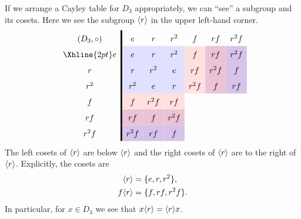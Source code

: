 \documentclass{ximera}
\begin{document}
\begin{example}
  If we arrange a Cayley table for $D_3$ appropriately, we can ``see''
  a subgroup and its cosets. Here we see the subgroup $\langle r\rangle$ in the
  upper left-hand corner.
    \[
    \renewcommand{\arraystretch}{1.6}
    \begin{array}{c!{\vline width 2pt}cccccc}
      (D_3,\circ)& e                              & r                              & r^2                            & f                             & r f                                   & r^2 f  \\  \Xhline{2pt}
      e          & e\cellcolor{blue!12!white}     & r\cellcolor{blue!12!white}    & r^2\cellcolor{blue!12!white}   & f \cellcolor{red!12!white}    & r f \cellcolor{blue!33!red!24!white}   & r^2f \cellcolor{blue!66!red!24!white} \\  
      r                                  & r\cellcolor{blue!12!white}    & r^2\cellcolor{blue!12!white}   & e \cellcolor{blue!12!white}    & rf\cellcolor{red!12!white} & r^2f \cellcolor{blue!33!red!24!white}    & f \cellcolor{blue!66!red!24!white}   \\  
      r^2                                 & r^2\cellcolor{blue!12!white}   & e\cellcolor{blue!12!white}     & r\cellcolor{blue!12!white}    & r^2 f \cellcolor{red!12!white}   & f \cellcolor{blue!33!red!24!white} & rf \cellcolor{blue!66!red!24!white}   \\  
      f        & f \cellcolor{red!12!white}    & r^2f \cellcolor{red!12!white}   & r f \cellcolor{red!12!white} &     &   &   \\  
      r f       & rf \cellcolor{blue!33!red!24!white}   & f \cellcolor{blue!33!red!24!white} & r^2f \cellcolor{blue!33!red!24!white}   &    &      &     \\  
      r^2 f       & r^2 f\cellcolor{blue!66!red!24!white} & rf \cellcolor{blue!66!red!24!white}    & f \cellcolor{blue!66!red!24!white}  &     &     &      \\  
    \end{array}
    \]
    The left cosets of $\langle r\rangle$ are below $\langle r\rangle$ and the right cosets
    of $\langle r\rangle$ are to the right of $\langle r\rangle$. Explicitly, the cosets are
    \begin{align*}
      \langle r\rangle &= \{e, r, r^2\},\\
      f\langle r\rangle &= \{f, rf, r^2f\}.
    \end{align*}
    In particular, for $x\in D_3$ we see that $x\langle r\rangle = \langle r\rangle x$.
\end{example}
\end{document}
